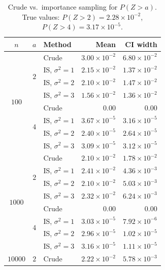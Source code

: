 \begin{table}[h]
\centering
\caption{Crude vs.\ importance sampling for $P(Z>a)$. True values:
$P(Z>2) = 2.28\times10^{-2}$, $P(Z>4) = 3.17\times10^{-5}$.}
\label{tab:is7}
\begin{tabular}{cclrr}
\toprule
$n$ & $a$ & Method & Mean & CI width \\
\midrule
\multirow{8}{*}{$100$}
 & \multirow{4}{*}{$2$} & Crude            & $3.00\times10^{-2}$ & $6.80\times10^{-2}$ \\
 &                      & IS, $\sigma^2=1$ & $2.15\times10^{-2}$ & $1.37\times10^{-2}$ \\
 &                      & IS, $\sigma^2=2$ & $2.10\times10^{-2}$ & $1.47\times10^{-2}$ \\
 &                      & IS, $\sigma^2=3$ & $1.56\times10^{-2}$ & $1.36\times10^{-2}$ \\
\cmidrule(l){2-5}
 & \multirow{4}{*}{$4$} & Crude            & $0.00$              & $0.00$ \\
 &                      & IS, $\sigma^2=1$ & $3.67\times10^{-5}$ & $3.16\times10^{-5}$ \\
 &                      & IS, $\sigma^2=2$ & $2.40\times10^{-5}$ & $2.64\times10^{-5}$ \\
 &                      & IS, $\sigma^2=3$ & $3.09\times10^{-5}$ & $3.12\times10^{-5}$ \\
\midrule
\multirow{8}{*}{$1000$}
 & \multirow{4}{*}{$2$} & Crude            & $2.10\times10^{-2}$ & $1.78\times10^{-2}$ \\
 &                      & IS, $\sigma^2=1$ & $2.41\times10^{-2}$ & $4.36\times10^{-3}$ \\
 &                      & IS, $\sigma^2=2$ & $2.10\times10^{-2}$ & $5.03\times10^{-3}$ \\
 &                      & IS, $\sigma^2=3$ & $2.32\times10^{-2}$ & $6.24\times10^{-3}$ \\
\cmidrule(l){2-5}
 & \multirow{4}{*}{$4$} & Crude            & $0.00$              & $0.00$ \\
 &                      & IS, $\sigma^2=1$ & $3.03\times10^{-5}$ & $7.92\times10^{-6}$ \\
 &                      & IS, $\sigma^2=2$ & $2.96\times10^{-5}$ & $1.02\times10^{-5}$ \\
 &                      & IS, $\sigma^2=3$ & $3.16\times10^{-5}$ & $1.11\times10^{-5}$ \\
\midrule
\multirow{8}{*}{$10000$}
 & \multirow{4}{*}{$2$} & Crude            & $2.22\times10^{-2}$ & $5.78\times10^{-3}$ \\

\end{tabular}
\end{table}
